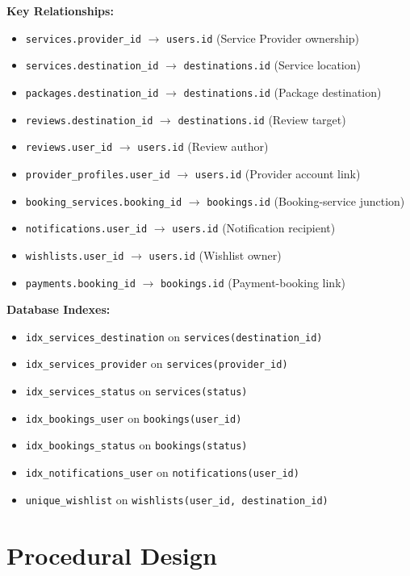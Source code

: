 \textbf{Key Relationships:}
\begin{itemize}[leftmargin=2em]
    \item \texttt{services.provider\_id} $\rightarrow$ \texttt{users.id} (Service Provider ownership)
    \item \texttt{services.destination\_id} $\rightarrow$ \texttt{destinations.id} (Service location)
    \item \texttt{packages.destination\_id} $\rightarrow$ \texttt{destinations.id} (Package destination)
    \item \texttt{reviews.destination\_id} $\rightarrow$ \texttt{destinations.id} (Review target)
    \item \texttt{reviews.user\_id} $\rightarrow$ \texttt{users.id} (Review author)
    \item \texttt{provider\_profiles.user\_id} $\rightarrow$ \texttt{users.id} (Provider account link)
    \item \texttt{booking\_services.booking\_id} $\rightarrow$ \texttt{bookings.id} (Booking-service junction)
    \item \texttt{notifications.user\_id} $\rightarrow$ \texttt{users.id} (Notification recipient)
    \item \texttt{wishlists.user\_id} $\rightarrow$ \texttt{users.id} (Wishlist owner)
    \item \texttt{payments.booking\_id} $\rightarrow$ \texttt{bookings.id} (Payment-booking link)
\end{itemize}

\textbf{Database Indexes:}
\begin{itemize}[leftmargin=2em]
    \item \texttt{idx\_services\_destination} on \texttt{services(destination\_id)}
    \item \texttt{idx\_services\_provider} on \texttt{services(provider\_id)}
    \item \texttt{idx\_services\_status} on \texttt{services(status)}
    \item \texttt{idx\_bookings\_user} on \texttt{bookings(user\_id)}
    \item \texttt{idx\_bookings\_status} on \texttt{bookings(status)}
    \item \texttt{idx\_notifications\_user} on \texttt{notifications(user\_id)}
    \item \texttt{unique\_wishlist} on \texttt{wishlists(user\_id, destination\_id)}
\end{itemize}

\section{Procedural Design}

